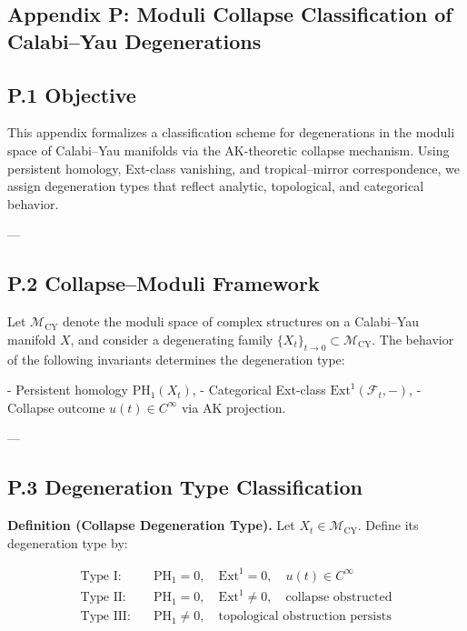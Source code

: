 \documentclass[11pt]{article}
\begin{document}
\begin{axiom}
\begin{axiom}
{{%
\section*{Appendix P: Moduli Collapse Classification of Calabi–Yau Degenerations}

\subsection*{P.1 Objective}

This appendix formalizes a classification scheme for degenerations in the moduli space of Calabi–Yau manifolds  
via the AK-theoretic collapse mechanism. Using persistent homology, Ext-class vanishing, and tropical–mirror correspondence,  
we assign degeneration types that reflect analytic, topological, and categorical behavior.

---

\subsection*{P.2 Collapse–Moduli Framework}

Let \( \mathcal{M}_{\mathrm{CY}} \) denote the moduli space of complex structures on a Calabi–Yau manifold \( X \),  
and consider a degenerating family \( \{X_t\}_{t \to 0} \subset \mathcal{M}_{\mathrm{CY}} \). The behavior of the following invariants determines the degeneration type:

- Persistent homology \( \mathrm{PH}_1(X_t) \),
- Categorical Ext-class \( \mathrm{Ext}^1(\mathcal{F}_t, -) \),
- Collapse outcome \( u(t) \in C^\infty \) via AK projection.

---

\subsection*{P.3 Degeneration Type Classification}

\textbf{Definition (Collapse Degeneration Type).}  
Let \( X_t \in \mathcal{M}_{\mathrm{CY}} \). Define its degeneration type by:

\[
\begin{aligned}
\text{Type I:} &\quad \mathrm{PH}_1 = 0,\quad \mathrm{Ext}^1 = 0,\quad u(t) \in C^\infty \\
\text{Type II:} &\quad \mathrm{PH}_1 = 0,\quad \mathrm{Ext}^1 \neq 0,\quad \text{collapse obstructed} \\
\text{Type III:} &\quad \mathrm{PH}_1 \neq 0,\quad \text{topological obstruction persists}
\end{aligned}
\]

}}
\end{axiom}
\end{axiom}
\end{document}
